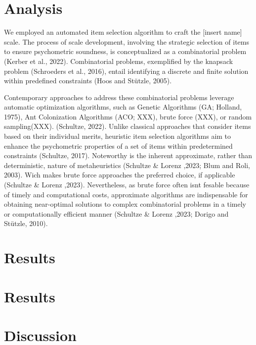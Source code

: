 \documentclass[
  12pt,
  a4paper,
  twoside]{article}
\begin{document}
\hypertarget{analysis-1}{%
\section{Analysis}\label{analysis-1}}

We employed an automated item selection algorithm to craft the {[}insert name{]} scale. The process of scale development, involving the strategic selection of items to ensure psychometric soundness, is conceptualized as a combinatorial problem (Kerber et al., 2022). Combinatorial problems, exemplified by the knapsack problem (Schroeders et al., 2016), entail identifying a discrete and finite solution within predefined constraints (Hoos and Stützle, 2005).

Contemporary approaches to address these combinatorial problems leverage automatic optimization algorithms, such as Genetic Algorithms (GA; Holland, 1975), Ant Colonization Algorithms (ACO; XXX), brute force (XXX), or random sampling(XXX). (Schultze, 2022).
Unlike classical approaches that consider items based on their individual merits, heuristic item selection algorithms aim to enhance the psychometric properties of a set of items within predetermined constraints (Schultze, 2017).
Noteworthy is the inherent approximate, rather than deterministic, nature of metaheuristics (Schultze \& Lorenz ,2023; Blum and Roli, 2003). Wich makes brute force approaches the preferred choice, if applicable (Schultze \& Lorenz ,2023). Nevertheless, as brute force often isnt fesable because of timely and computational costs, approximate algorithms are indispensable for obtaining near-optimal solutions to complex combinatorial problems in a timely or computationally efficient manner (Schultze \& Lorenz ,2023; Dorigo and Stützle, 2010).

\hypertarget{results}{%
\section*{Results}\label{results}}

\hypertarget{results-1}{%
\section{Results}\label{results-1}}

\hypertarget{discussion}{%
\section*{Discussion}\label{discussion}}
\end{document}
